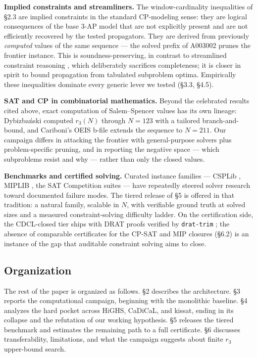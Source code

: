 \textbf{Implied constraints and streamliners.} The window-cardinality
inequalities of §2.3 are implied constraints in the standard CP-modeling
sense: they are logical consequences of the base 3-AP model that are not
explicitly present and are not efficiently recovered by the tested
propagators. They are derived from previously \emph{computed} values of the
same sequence --- the solved prefix of A003002 prunes the frontier
instance. This is soundness-preserving, in contrast to streamlined
constraint reasoning \cite{gomes-sellmann-2004}, which deliberately
sacrifices completeness; it is closer in spirit to bound propagation from
tabulated subproblem optima. Empirically these inequalities dominate
every generic lever we tested (§3.3, §4.5).

\textbf{SAT and CP in combinatorial mathematics.} Beyond the celebrated
results cited above, exact computation of Salem--Spencer values has its
own lineage: Dybizba\'nski \cite{dybizbanski-2012} computed
$r_3(N)$ through $N = 123$ with a tailored
branch-and-bound, and Cariboni's OEIS b-file \cite{cariboni-b003002}
extends the sequence to $N = 211$. Our campaign differs in
attacking the frontier with general-purpose solvers plus
problem-specific pruning, and in reporting the negative space --- which
subproblems resist and why --- rather than only the closed values.

\textbf{Benchmarks and certified solving.} Curated instance families ---
CSPLib \cite{gent-walsh-1999-csplib}, MIPLIB \cite{gleixner-miplib-2021},
the SAT Competition suites --- have repeatedly steered solver research
toward documented failure modes. The tiered release of §5 is offered in
that tradition: a natural family, scalable in $N$, with verifiable
ground truth at solved sizes and a measured constraint-solving difficulty
ladder. On the certification side, the CDCL-closed tier ships with
DRAT proofs verified by \texttt{drat-trim}
\cite{heule-hunt-biere-drat-2014,cruz-filipe-lrat-2017}; the absence of
comparable certificates for the CP-SAT and MIP closures (§6.2) is an
instance of the gap that auditable constraint solving
\cite{gocht-mccreesh-nordstrom-2022} aims to close.

\subsection{Organization}\label{organization}

The rest of the paper is organized as follows. §2 describes the
architecture. §3 reports the computational campaign, beginning with the
monolithic baseline. §4 analyzes the hard pocket across HiGHS, CaDiCaL,
and kissat, ending in its collapse and the refutation of our working
hypothesis. §5 releases the tiered benchmark and estimates the remaining
path to a full certificate. §6 discusses transferability, limitations,
and what the campaign suggests about finite $r_3$ upper-bound search.

